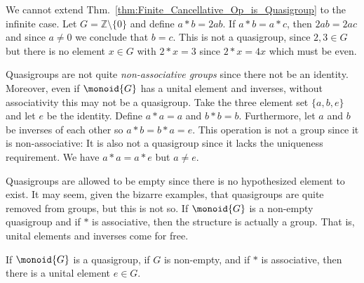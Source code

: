         \begin{example}
            We cannot extend Thm.~\ref{thm:Finite_Cancellative_Op_is_Quasigroup}
            to the infinite case. Let $G=\mathbb{Z}\setminus\{0\}$ and define
            $a*b=2ab$. If $a*b=a*c$, then $2ab=2ac$ and since $a\ne{0}$ we
            conclude that $b=c$. This is not a quasigroup, since
            $2,3\in{G}$ but there is no element $x\in{G}$ with
            $2*x=3$ since $2*x=4x$ which must be even.
        \end{example}
        \begin{example}
            Quasigroups are not quite \textit{non-associative groups} since
            there not be an identity. Moreover, even if $\monoid{G}$ has a
            unital element and inverses, without associativity this may not be a
            quasigroup. Take the three element set $\{a,b,e\}$ and let $e$ be
            the identity. Define $a*a=a$ and $b*b=b$. Furthermore, let $a$ and
            $b$ be inverses of each other so $a*b=b*a=e$. This operation is
            not a group since it is non-associative:
            \vspace{-2.5ex}
            It is also not a quasigroup since it lacks the uniqueness
            requirement. We have $a*a=a*e$ but $a\ne{e}$.
        \end{example}
        Quasigroups are allowed to be empty since there is no hypothesized
        element to exist. It may seem, given the bizarre examples, that
        quasigroups are quite removed from groups, but this is not so. If
        $\monoid{G}$ is a non-empty quasigroup and if $*$ is associative, then
        the structure is actually a group. That is, unital elements and inverses
        come for free.
        \begin{theorem}
            \label{thm:Non_Empty_Assoc_Quasigroup_Has_Identity}%
            If $\monoid{G}$ is a quasigroup, if $G$ is non-empty, and if $*$ is
            associative, then there is a unital element $e\in{G}$.
        \end{theorem}
